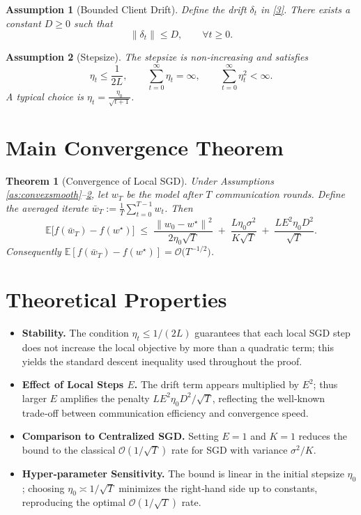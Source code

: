 \documentclass{article}
\newtheorem{theorem}{Theorem}
\newtheorem{assumption}{Assumption}
\newcommand{\E}{\mathbb{E}}
\newcommand{\norm}[1]{\left\lVert #1 \right\rVert}
\begin{document}
\begin{assumption}[Bounded Client Drift]\label{as:drift}
Define the drift $\delta_t$ in \eqref{3}. There exists a constant $D\ge0$ such that
\[
\norm{\delta_t}\le D,\qquad\forall t\ge0 .
\]
\end{assumption}

\begin{assumption}[Stepsize]\label{as:stepsize}
The stepsize is non‑increasing and satisfies
\[
\eta_t \le \frac{1}{2L},\qquad
\sum_{t=0}^{\infty}\eta_t =\infty,\qquad
\sum_{t=0}^{\infty}\eta_t^2 <\infty .
\]
A typical choice is $\eta_t=\frac{\eta_0}{\sqrt{t+1}}$.
\end{assumption}

\section*{Main Convergence Theorem}
\begin{theorem}[Convergence of Local SGD]\label{thm:main}
Under Assumptions \ref{as:convexsmooth}–\ref{as:stepsize},
let $w_T$ be the model after $T$ communication rounds.
Define the averaged iterate $\bar w_T:=\frac{1}{T}\sum_{t=0}^{T-1} w_t$.
Then
\[
\E\!\bigl[f(\bar w_T)-f(w^\star)\bigr]
\;\le\;
\frac{\norm{w_0-w^\star}^2}{2\eta_0\sqrt{T}}
\;+\;
\frac{L\eta_0\sigma^2}{K\sqrt{T}}
\;+\;
\frac{L E^2 \eta_0 D^2}{\sqrt{T}} .
\tag{4}
\]
Consequently $\E[f(\bar w_T)-f(w^\star)]=\mathcal O\!\bigl(T^{-1/2}\bigr)$.
\end{theorem}

\section*{Theoretical Properties}
\begin{itemize}
\item \textbf{Stability.} The condition $\eta_t\le 1/(2L)$ guarantees that each local SGD step does not increase the local objective by more than a quadratic term; this yields the standard descent inequality used throughout the proof.
\item \textbf{Effect of Local Steps $E$.} The drift term appears multiplied by $E^2$; thus larger $E$ amplifies the penalty $L E^2\eta_0 D^2/\sqrt{T}$, reflecting the well‑known trade‑off between communication efficiency and convergence speed.
\item \textbf{Comparison to Centralized SGD.} Setting $E=1$ and $K=1$ reduces the bound to the classical $\mathcal O(1/\sqrt{T})$ rate for SGD with variance $\sigma^2/K$.
\item \textbf{Hyper‑parameter Sensitivity.} The bound is linear in the initial stepsize $\eta_0$; choosing $\eta_0\asymp 1/\sqrt{T}$ minimizes the right‑hand side up to constants, reproducing the optimal $\mathcal O(1/\sqrt{T})$ rate.
\end{itemize}
\end{document}
